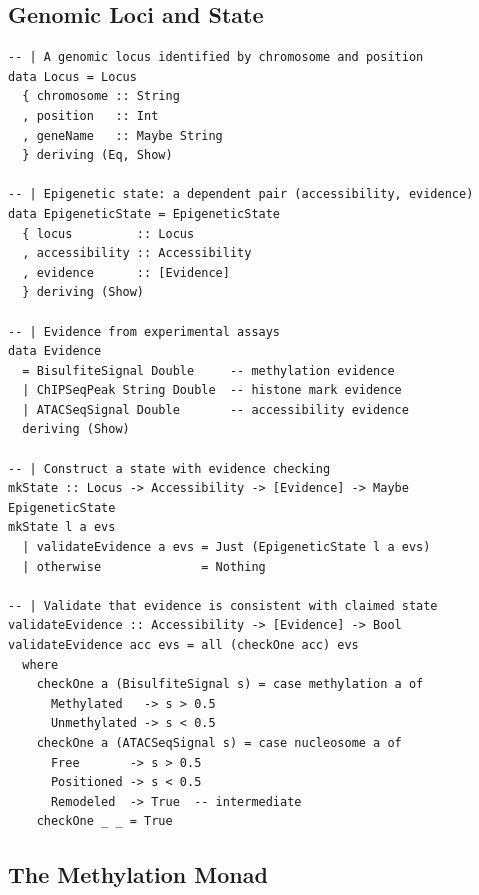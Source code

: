 \documentclass[12pt,a4paper]{article}
\begin{document}
\subsection{Genomic Loci and State}

\begin{lstlisting}[caption={Genomic loci and epigenetic state}]
-- | A genomic locus identified by chromosome and position
data Locus = Locus
  { chromosome :: String
  , position   :: Int
  , geneName   :: Maybe String
  } deriving (Eq, Show)

-- | Epigenetic state: a dependent pair (accessibility, evidence)
data EpigeneticState = EpigeneticState
  { locus         :: Locus
  , accessibility :: Accessibility
  , evidence      :: [Evidence]
  } deriving (Show)

-- | Evidence from experimental assays
data Evidence
  = BisulfiteSignal Double     -- methylation evidence
  | ChIPSeqPeak String Double  -- histone mark evidence
  | ATACSeqSignal Double       -- accessibility evidence
  deriving (Show)

-- | Construct a state with evidence checking
mkState :: Locus -> Accessibility -> [Evidence] -> Maybe EpigeneticState
mkState l a evs
  | validateEvidence a evs = Just (EpigeneticState l a evs)
  | otherwise              = Nothing

-- | Validate that evidence is consistent with claimed state
validateEvidence :: Accessibility -> [Evidence] -> Bool
validateEvidence acc evs = all (checkOne acc) evs
  where
    checkOne a (BisulfiteSignal s) = case methylation a of
      Methylated   -> s > 0.5
      Unmethylated -> s < 0.5
    checkOne a (ATACSeqSignal s) = case nucleosome a of
      Free       -> s > 0.5
      Positioned -> s < 0.5
      Remodeled  -> True  -- intermediate
    checkOne _ _ = True
\end{lstlisting}

\subsection{The Methylation Monad}
\end{document}

